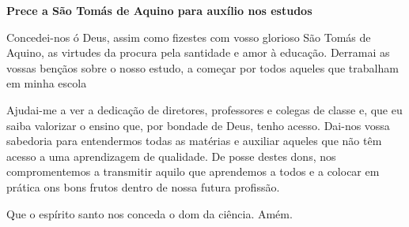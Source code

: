 \documentclass{article}
\begin{document}
\clearpage

\vspace{5mm} %

\textbf{Prece a São Tomás de Aquino para auxílio nos estudos}\\

\vspace{5mm} %

Concedei-nos ó Deus, assim como fizestes com vosso glorioso São Tomás de Aquino, as virtudes da procura pela santidade e amor à educação. Derramai as vossas bençãos sobre o nosso estudo, a começar por todos aqueles que trabalham em minha escola\par Ajudai-me a ver a dedicação de diretores, professores e colegas de classe e, que eu saiba valorizar o ensino que, por bondade de Deus, tenho acesso. Dai-nos vossa sabedoria para entendermos todas as matérias e auxiliar aqueles que não têm acesso a uma aprendizagem de qualidade. De posse destes dons, nos compromentemos a transmitir aquilo que aprendemos a todos e a colocar em prática ons bons frutos dentro de nossa futura profissão.\par Que o espírito santo nos conceda o dom da ciência. Amém.\par
\end{document}
